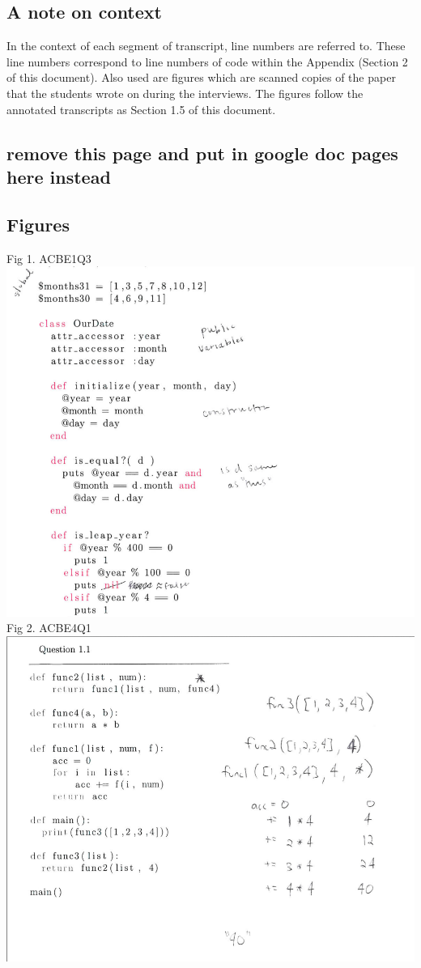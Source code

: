 \documentclass{article}
\begin{document}
\subsection{A note on context}
In the context of each segment of transcript, line numbers are referred to. These line numbers correspond to line numbers of code within the Appendix (Section 2 of this document). Also used are figures which are scanned copies of the paper that the students wrote on during the interviews. The figures follow the annotated transcripts as Section 1.5 of this document.

\newpage
\subsection{remove this page and put in google doc pages here instead}
\newpage
\subsection{Figures}
Fig 1. ACBE1Q3 \\
\includegraphics[scale=0.7]{ACBE1Q3.png}
\newpage
Fig 2. ACBE4Q1 \\
\includegraphics[scale=0.6]{ACBE4Q1.png}
\end{document}
